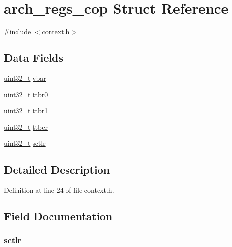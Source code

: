 \hypertarget{structarch__regs__cop}{\section{arch\-\_\-regs\-\_\-cop \-Struct \-Reference}
\label{structarch__regs__cop}
}


{\ttfamily \#include $<$context.\-h$>$}

\subsection*{\-Data \-Fields}
\begin{DoxyCompactItemize}
\item 
\hyperlink{arch__types_8h_a435d1572bf3f880d55459d9805097f62}{uint32\-\_\-t} \hyperlink{structarch__regs__cop_a335ee10c53de8aea54ce9cd9bc56d4e0}{vbar}
\item 
\hyperlink{arch__types_8h_a435d1572bf3f880d55459d9805097f62}{uint32\-\_\-t} \hyperlink{structarch__regs__cop_a63fedd79936a58893e5d3a188565c194}{ttbr0}
\item 
\hyperlink{arch__types_8h_a435d1572bf3f880d55459d9805097f62}{uint32\-\_\-t} \hyperlink{structarch__regs__cop_a1dca0b48c512d7e2301433e859d4007d}{ttbr1}
\item 
\hyperlink{arch__types_8h_a435d1572bf3f880d55459d9805097f62}{uint32\-\_\-t} \hyperlink{structarch__regs__cop_a18368f32ecf9fa858d6caedd845ec701}{ttbcr}
\item 
\hyperlink{arch__types_8h_a435d1572bf3f880d55459d9805097f62}{uint32\-\_\-t} \hyperlink{structarch__regs__cop_a07f46454f9d2a374f9118a03945d3551}{sctlr}
\end{DoxyCompactItemize}


\subsection{\-Detailed \-Description}


\-Definition at line 24 of file context.\-h.



\subsection{\-Field \-Documentation}
\hypertarget{structarch__regs__cop_a07f46454f9d2a374f9118a03945d3551}{
\subsubsection[{sctlr}]{ {\bf sctlr}}}\label{structarch__regs__cop_a07f46454f9d2a374f9118a03945d3551}


